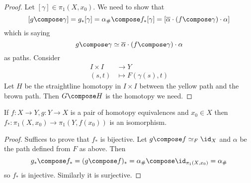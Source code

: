 \documentclass[a4paper]{article}
\begin{document}
\begin{proof}
  Let \([\gamma] \in \pi_1(X, x_0)\). We need to show that
  \[
    [g \compose \gamma] = g_*[\gamma] = \alpha_\# \compose f_*[\gamma] = [\overline \alpha \cdot (f \compose \gamma) \cdot \alpha]
  \]
  which is saying
  \[
    g \compose \gamma \simeq \overline \alpha \cdot (f \compose \gamma) \cdot \alpha
  \]
  as paths. Consider
  \begin{align*}
    I \times I &\to Y \\
    (s, t) &\mapsto F(\gamma(s), t)
  \end{align*}
  Let \(H\) be the straightline homotopy in \(I \times I\) between the yellow path and the brown path. Then \(G \compose H\) is the homotopy we need.
\end{proof}

\begin{theorem}
  If \(f: X \to Y, g: Y \to X\) is a pair of homotopy equivalences and \(x_0 \in X\) then \(f_*: \pi_1(X, x_0) \to \pi_1(Y, f(x_0))\) is an isomorphism.
\end{theorem}

\begin{proof}
  Suffices to prove that \(f_*\) is bijective. Let \(g \compose f \simeq_F \id_X\) and \(\alpha\) be the path defined from \(F\) as above. Then
  \[
    g_* \compose f_* = (g \compose f)_* = \alpha_\# \compose \id_{\pi_1(X, x_0)} = \alpha_\#
  \]
  so \(f_*\) is injective. Similarly it is surjective.
\end{proof}































\printindex
\end{document}
